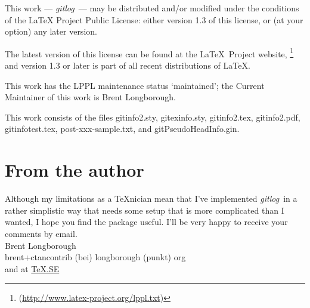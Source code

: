 \documentclass[a4paper,12pt,twoside,openany]{memoir}
\newcommand{\sfit}[1]{\textit{#1}}
\newcommand{\tpname}{\sfit{gitlog}}
\begin{document}
This work --- \tpname\ --- may be distributed and/or modified under the
conditions of the LaTeX Project Public License: either version 1.3
of this license, or (at your option) any later version.

The latest version of this license can be found
at the \LaTeX\ Project website,%
\footnote{(\url{http://www.latex-project.org/lppl.txt})}
and version 1.3 or later is part of all recent distributions of
\LaTeX.

This work has the LPPL maintenance status `maintained';
the Current Maintainer of this work is Brent Longborough.

This work consists of the files
gitinfo2.sty, gitexinfo.sty, gitinfo2.tex, gitinfo2.pdf,
gitinfotest.tex, post-xxx-sample.txt,
and gitPseudoHeadInfo.gin.

\section{From the author}
Although my limitations as a \TeX nician
mean that I've implemented \tpname\ in a rather simplistic way
that needs some setup that is more complicated than I wanted,
I hope you find the package useful.
I'll be very happy to receive your comments by email.\\[\baselineskip]
Brent Longborough\\[\baselineskip]
\textsf{brent+ctancontrib (bei) longborough (punkt) org}\\
and at \href{http://tex.stackexchange.com/users/344/brent-longborough}{\TeX.SE}
\printGitLog
\clearpage
\raggedright
\printpagenotes
\end{document}
